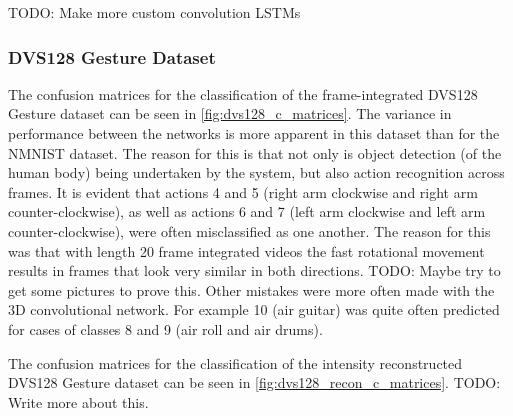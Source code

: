 \color{red} TODO: Make more custom convolution LSTMs \color{black}

\subsubsection{DVS128 Gesture Dataset}

The confusion matrices for the classification of the frame-integrated DVS128 Gesture dataset can be seen in \cref{fig:dvs128_c_matrices}. The variance in performance between the networks is more apparent in this dataset than for the NMNIST dataset. The reason for this is that not only is object detection (of the human body) being undertaken by the system, but also action recognition across frames. It is evident that actions 4 and 5 (right arm clockwise and right arm counter-clockwise), as well as actions 6 and 7 (left arm clockwise and left arm counter-clockwise), were often misclassified as one another. The reason for this was that with length 20 frame integrated videos the fast rotational movement results in frames that look very similar in both directions. \color{red} TODO: Maybe try to get some pictures to prove this. \color{black} Other mistakes were more often made with the 3D convolutional network. For example 10 (air guitar) was quite often predicted for cases of classes 8 and 9 (air roll and air drums). 

The confusion matrices for the classification of the intensity reconstructed DVS128 Gesture dataset can be seen in \cref{fig:dvs128_recon_c_matrices}. \color{red} TODO: Write more about this. \color{black}

